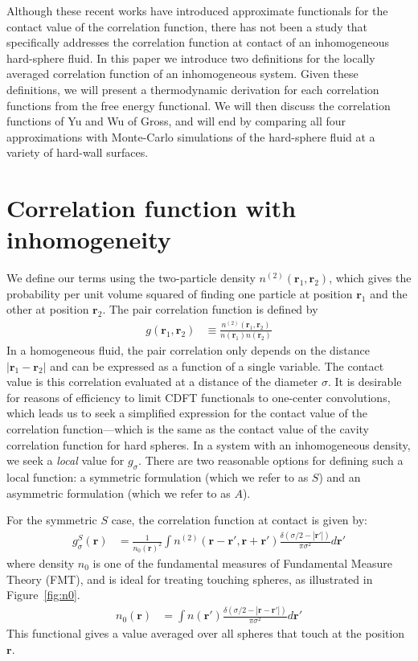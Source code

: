 \documentclass[letterpaper,twocolumn,amsmath,amssymb,jcp,10pt,aip]{revtex4-1}
\newcommand{\rr}{\textbf{r}}
\begin{document}
Although these recent works have introduced approximate functionals
for the contact value of the correlation
function\cite{yu2002fmt-dft-inhomogeneous-associating,
  gross2009density}, there has not been a study that specifically
addresses the correlation function at contact of an inhomogeneous
hard-sphere fluid.
%
In this paper we introduce two definitions for the locally averaged
correlation function of an inhomogeneous system.
%
%
Given these definitions, we will present a thermodynamic derivation
for each correlation functions from the free energy functional.  We
will then discuss the correlation functions of Yu and Wu of Gross, and
will end by comparing all four approximations with Monte-Carlo
simulations of the hard-sphere fluid at a variety of hard-wall
surfaces.


\section{Correlation function with inhomogeneity}

We define our terms using the two-particle density
$n^{(2)}(\rr_1,\rr_2)$, which gives the probability per unit volume
squared of finding one particle at position $\rr_1$ and the other at
position $\rr_2$.  The pair correlation function is defined by
\begin{align}
  g(\rr_1,\rr_2) &\equiv \frac{n^{(2)}(\rr_1,\rr_2)}{n(\rr_1)n(\rr_2)}
\end{align}
In a homogeneous fluid, the pair correlation only depends on the
distance $|\rr_1-\rr_2|$ and can be expressed as a function of a
single variable. The contact value is this correlation evaluated at a distance of the
diameter $\sigma$.  It is desirable for reasons of efficiency to limit CDFT
functionals to one-center convolutions, which leads us to seek a
simplified expression for the contact value of the correlation
function---which is the same as the contact value of the cavity
correlation function for hard spheres.
In a system with an inhomogeneous density, we seek a \emph{local}
value for $g_\sigma$.  There are two reasonable options for defining
such a local function: a symmetric formulation (which we refer to as $S$) and an
asymmetric formulation (which we refer to as $A$).

For the symmetric $S$ case, the correlation function at contact is
given by:
\begin{align}
  g^S_\sigma(\rr) &= \frac{1}{n_0(\rr)^2}\int n^{(2)}(\rr - \rr', \rr
  + \rr')
  \frac{\delta(\sigma/2 -|\rr'|)}{\pi\sigma^2}d\rr' \label{eq:gS}
\end{align}
where density $n_0$ is one of the fundamental measures of Fundamental
Measure Theory (FMT), and is ideal for treating touching spheres, as
illustrated in Figure~\ref{fig:n0}.
\begin{align}
  n_0(\rr) &= \int n(\rr')\frac{\delta(\sigma/2 -|\rr-\rr'|)}{\pi\sigma^2} d\rr'
\end{align}
This functional gives a value averaged over all spheres that touch at
the position $\rr$.
\end{document}
